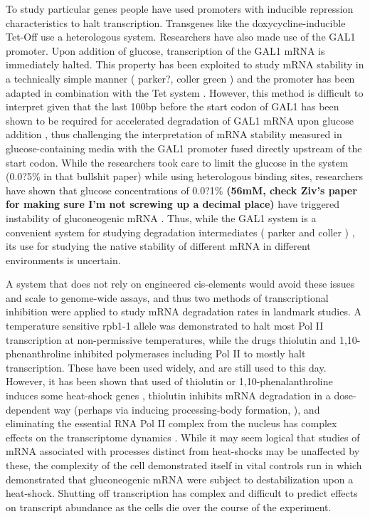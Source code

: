 {To study
particular genes people have used promoters with inducible repression
characteristics to halt transcription. Transgenes like the
doxycycline-inducible Tet-Off 
\parencite{gari1997set} use a heterologous
system. Researchers have also made use of the GAL1 promoter. Upon
addition of glucose, transcription of the GAL1 mRNA is immediately
halted. This property has been exploited to study mRNA stability in a
technically simple manner 
( parker?, coller green )
and the promoter
has been adapted in combination with the Tet system 
\parencite{baudrimont2017multiplexed}. 
However, this method is difficult to interpret given that 
the last 100bp before the start
codon of GAL1 has been shown to be required for accelerated
degradation of GAL1 mRNA upon glucose addition 
\parencite{baumgartner2011antagonistic},
thus challenging the interpretation of mRNA stability measured in
glucose-containing media with the GAL1 promoter fused directly
upstream of the start codon. While the researchers took care to limit
the glucose in the system (0.0?5\% in that bullshit paper) while using
heterologous binding sites, researchers have shown that glucose
concentrations of 0.0?1\% 
\textbf{(56mM, check Ziv’s paper for making sure I’m
not screwing up a decimal place)} have triggered instability of
gluconeogenic mRNA \textbf{\parencite{yin2000,yin2003}}. 
Thus, while the GAL1
system is a convenient system for studying degradation intermediates 
( parker and coller )
, its use for studying the native stability of
different mRNA in different environments is uncertain.  

A system
that does not rely on engineered cis-elements would avoid these issues
and scale to genome-wide assays, and thus two methods of
transcriptional inhibition were applied to study mRNA degradation
rates in landmark studies. A temperature sensitive rpb1-1 allele was
demonstrated to halt most Pol II transcription at non-permissive
temperatures, while the drugs thiolutin and 1,10-phenanthroline
inhibited polymerases including Pol II to mostly halt transcription.
These have been used widely, and are still used to this day. However,
it has been shown that used of thiolutin or 1,10-phenalanthroline
induces some heat-shock genes \parencite{adams1991yeast}, thiolutin
inhibits mRNA degradation in a dose-dependent way 
\parencite{pelechano2008transcriptional}
(perhaps via inducing processing-body formation,
\cite{huch2016decapping}), 
and eliminating the essential RNA Pol II complex
from the nucleus has complex effects on the transcriptome dynamics 
\parencite{yu2016rna}. While it may seem logical that studies of mRNA
associated with processes distinct from heat-shocks may be unaffected
by these, the complexity of the cell demonstrated itself in vital
controls run in \cite{mercado1994levels} which demonstrated that
gluconeogenic mRNA were subject to destabilization upon a
heat-shock. Shutting off transcription has complex and difficult to
predict effects on transcript abundance as the cells die over the
course of the experiment.  

}
